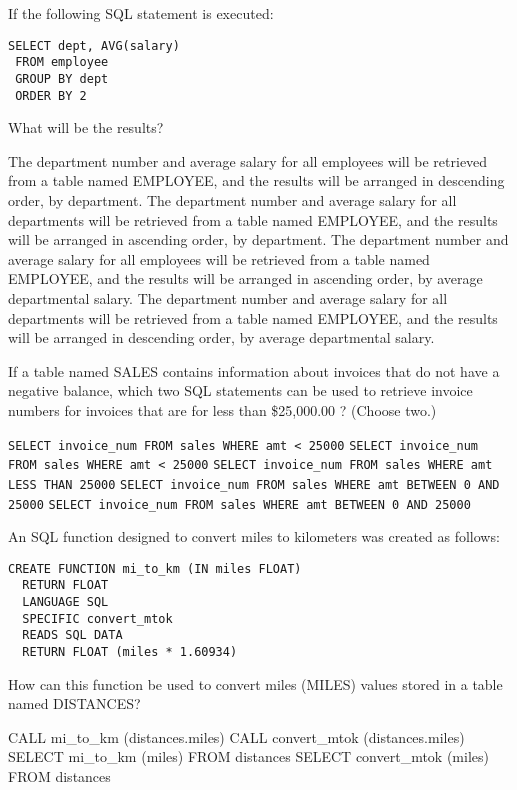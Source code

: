 \documentclass[11pt]{exam}
\begin{document}
\begin{questions}
\question[1]
If the following SQL statement is executed:
\begin{verbatim}
SELECT dept, AVG(salary)
 FROM employee
 GROUP BY dept
 ORDER BY 2
\end{verbatim}
What will be the results?
\begin{choices}
\choice The department number and average salary for all employees will be retrieved from a table named
EMPLOYEE, and the results will be arranged in descending order, by department.
\choice The department number and average salary for all departments will be retrieved from a table named
EMPLOYEE, and the results will be arranged in ascending order, by department.
\choice The department number and average salary for all employees will be retrieved from a table named
EMPLOYEE, and the results will be arranged in ascending order, by average departmental salary.
\choice The department number and average salary for all departments will be retrieved from a table named
EMPLOYEE, and the results will be arranged in descending order, by average departmental salary.
\end{choices}

\newpage
\question[1]
If a table named SALES contains information about invoices that do not have a negative balance, which 
two SQL statements can be used to retrieve invoice numbers for invoices that are for less than \$25,000.00
? (Choose two.)
\begin{choices}
\choice \texttt{SELECT invoice\_num FROM sales WHERE amt < 25000}
\choice \texttt{SELECT invoice\_num FROM sales WHERE amt < 25000}
\choice \texttt{SELECT invoice\_num FROM sales WHERE amt LESS THAN 25000}
\choice \texttt{SELECT invoice\_num FROM sales WHERE amt BETWEEN 0 AND 25000}
\choice \texttt{SELECT invoice\_num FROM sales WHERE amt BETWEEN 0 AND 25000}
\end{choices}

\question[1]
An SQL function designed to convert miles to kilometers was created as follows:
\begin{verbatim}
CREATE FUNCTION mi_to_km (IN miles FLOAT)
  RETURN FLOAT
  LANGUAGE SQL
  SPECIFIC convert_mtok
  READS SQL DATA
  RETURN FLOAT (miles * 1.60934)
\end{verbatim}
How can this function be used to convert miles (MILES) values stored in a table named DISTANCES?
\begin{choices}
\choice CALL mi\_to\_km (distances.miles)
\choice CALL convert\_mtok (distances.miles)
\choice SELECT mi\_to\_km (miles) FROM distances
\choice SELECT convert\_mtok (miles) FROM distances
\end{choices}


\end{questions}
\end{document}
